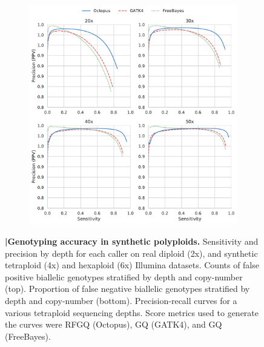 \documentclass[notitlepage, twocolumn, 10pt]{article}
\begin{document}
\begin{figure}[ht!]
    \begin{subfigure}[b]{0.4\textwidth}
     	\vspace{-0.5cm}
        \caption{}
        \vspace{-0.5cm}
        \includegraphics[height=\textwidth,width=\textwidth]{figures/synthetic-tetraploid-pr-curves_20-50x}
        \label{fig:synthetic:precision-recall}
    \end{subfigure}
    \vspace{-1cm}
    \caption{\textbf{|\:Genotyping accuracy in synthetic polyploids.} \protect{} Sensitivity and precision by depth for each caller on real diploid (2x), and synthetic tetraploid (4x) and hexaploid (6x) Illumina datasets. \protect{} Counts of false positive biallelic genotypes stratified by depth and copy-number (top). Proportion of false negative biallelic genotypes stratified by depth and copy-number (bottom). \protect{} Precision-recall curves for a various tetraploid sequencing depths. Score metrics used to generate the curves were RFGQ (Octopus), GQ (GATK4), and GQ (FreeBayes).}
    \label{fig:synthetic}
\end{figure}
\end{document}

